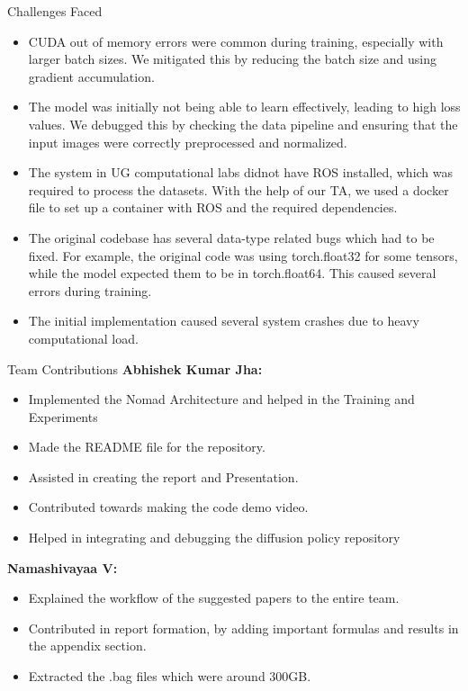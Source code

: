 \documentclass{beamer}
\begin{document}
\begin{frame}{Challenges Faced}
    \begin{itemize}
        \item CUDA out of memory errors were common during training, especially with larger batch sizes. We mitigated this by reducing the batch size and using gradient accumulation.
        \item The model was initially not being able to learn effectively, leading to high loss values. We debugged this by checking the data pipeline and ensuring that the input images were correctly preprocessed and normalized.
        \item The system in UG computational labs didnot have ROS installed, which was required to process the datasets. With the help of our TA, we used a docker file to set up a container with ROS and the required dependencies.
        \item The original codebase has several data-type related bugs which had to be fixed. For example, the original code was using torch.float32 for some tensors, while the model expected them to be in torch.float64. This caused several errors during training.
        \item The initial implementation caused several system crashes due to heavy computational load.
    \end{itemize}
\end{frame}

\begin{frame}{Team Contributions}
    \textbf{Abhishek Kumar Jha:} \\
    \begin{itemize}
        \item Implemented the Nomad Architecture and helped in the Training and Experiments
        \item Made the README file for the repository.
        \item Assisted in creating the report and Presentation.
        \item Contributed towards making the code demo video.
        \item Helped in integrating and debugging the diffusion policy repository
    
    \end{itemize}
    \textbf{Namashivayaa V:} \\
    \begin{itemize}
        \item Explained the workflow of the suggested papers to the entire team.
        \item Contributed in report formation, by adding important formulas and results in the
        appendix section.
        \item Extracted the .bag files which were around 300GB.
    \end{itemize}
\end{frame}
\end{document}
